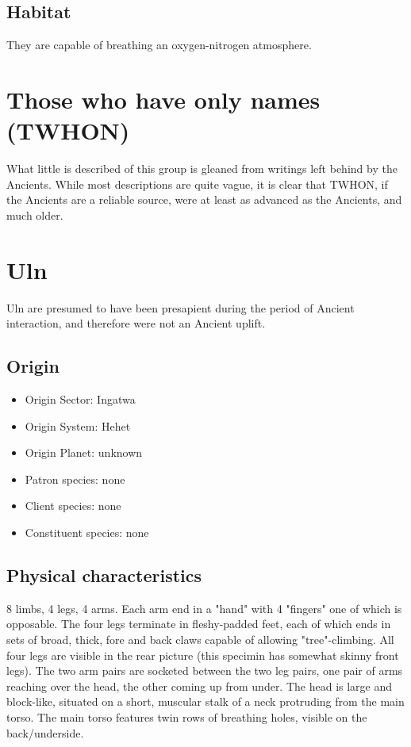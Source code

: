 \subsection{Habitat}
They are capable of breathing an oxygen-nitrogen atmosphere. 

\section{Those who have only names (TWHON)}

What little is described of this group is gleaned from writings left
behind by the Ancients. While most descriptions are quite vague, it is
clear that TWHON, if the Ancients are a reliable source, were at least
as advanced as the Ancients, and much older.

\section{Uln}

Uln are presumed to have been presapient during the period of Ancient interaction, and therefore were not an Ancient uplift.

\subsection{Origin}
\begin{itemize}
\item Origin Sector: Ingatwa
\item Origin System: Hehet
\item Origin Planet: unknown
\item Patron species: none
\item Client species: none
\item Constituent species: none 
\end{itemize}

\subsection{Physical characteristics}
 
8 limbs, 4 legs, 4 arms. Each arm end in a "hand" with 4 "fingers" one
of which is opposable. The four legs terminate in fleshy-padded feet,
each of which ends in sets of broad, thick, fore and back claws
capable of allowing "tree"-climbing. All four legs are visible in the
rear picture (this specimin has somewhat skinny front legs). The two
arm pairs are socketed between the two leg pairs, one pair of arms
reaching over the head, the other coming up from under. The head is
large and block-like, situated on a short, muscular stalk of a neck
protruding from the main torso. The main torso features twin rows of
breathing holes, visible on the back/underside.

